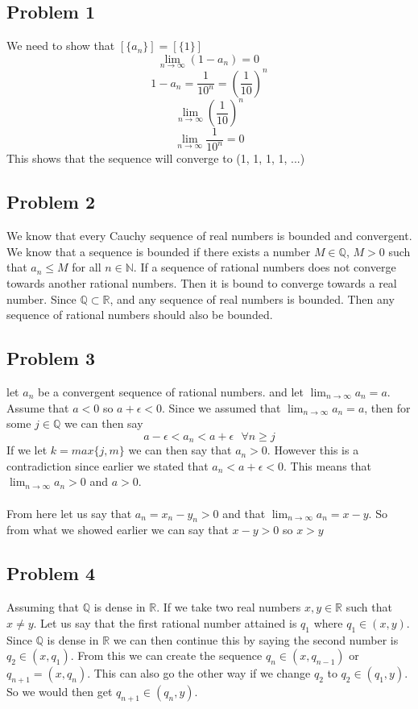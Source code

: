 \documentclass[12pt]{article}
\newcommand{\N}{\mathbb{N}}
\newcommand{\R}{\mathbb{R}}
\newcommand{\Q}{\mathbb{Q}}
\begin{document}
\subsection*{Problem 1}
We need to show that $[\{ a_n \}] = [\{ 1 \}]$
\[ \lim_{n \to \infty} (1 - a_n) = 0 \ \]
\[ 1 - a_n = \frac{1}{10^n} = \left( \frac{1}{10} \right)^n \]
\[ \lim_{n \to \infty} \left( \frac{1}{10} \right)^n\]
\[ \lim_{n \to \infty} \frac{1}{10^n} = 0 \]
This shows that the sequence will converge to (1, 1, 1, 1, ...)
\subsection*{Problem 2}
We know that every Cauchy sequence of real numbers is bounded and convergent. We know that a sequence is bounded if there exists a number $M \in \Q$, $M > 0$ such that $a_n \leq M$ for all $n \in \N$. If a sequence of rational numbers does not converge towards another rational numbers. Then it is bound to converge towards a real number. Since $\Q \subset \R$, and any sequence of real numbers is bounded. Then any sequence of rational numbers should also be bounded.
\subsection*{Problem 3}
let $a_n$ be a convergent sequence of rational numbers. and let $\lim_{n \to \infty}a_n = a$. Assume that $a < 0$ so $a + \epsilon	< 0$. Since we assumed that $\lim_{n \to \infty}a_n = a$, then for some $j \in \Q$ we can then say
\[ a - \epsilon < a_n < a + \epsilon \textbf{    }\forall n \geq j\]
If we let $k = max\{ j, m \}$ we can then say that $a_n > 0$. However this is a contradiction since earlier we stated that $a_n < a + \epsilon < 0$. This means that $\lim_{n \to \infty}a_n > 0$ and $a > 0$.\\\\
From here let us say that $a_n = x_n - y_n > 0$ and that $\lim_{n \to \infty} a_n = x - y$. So from what we showed earlier we can say that $x - y > 0$ so $x > y$
\subsection*{Problem 4}
Assuming that $\Q$ is dense in $\R$. If we take two real numbers $x,y \in \R$ such that $x \neq y$. Let us say that the first rational number attained is $q_1$ where $q_1 \in (x, y)$. Since $\Q$ is dense in $\R$ we can then continue this by saying the second number is $q_2 \in (x, q_1)$. From this we can create the sequence $q_{n} \in (x, q_{n-1}) $ or $q_{n + 1} = (x, q_n)$. This can also go the other way if we change $q_2$ to $q_2 \in (q_1, y)$. So we would then get $q_{n+1} \in (q_n, y)$.
\end{document}
